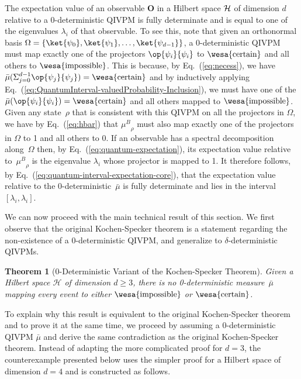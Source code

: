 \documentclass[english,reprint, aps, prl,superscriptaddress, showpacs,
showkeys, longbibliography, amsmath, amssymb, floatfix]{revtex4-1}
\theoremstyle{plain}
\newtheorem{thm}{Theorem}
\theoremstyle{definition}
\newcommand{\Hilb}{\mathcal{H}}
\newcommand{\imposs}{{\text{\wesa{impossible}}}}
\newcommand{\necess}{{\text{\wesa{certain}}}}
\newcommand{\proj}[1]{\op{#1}{#1}}
\newcommand{\muB}{\ensuremath{\mu^{B}}}
\begin{document}
The expectation value of an observable $\mathbf{O}$ in a Hilbert space
${\cal H}$ of dimension $d$ relative to a 0-deterministic QIVPM is
fully determinate and is equal to one of the eigenvalues $\lambda_i$
of that observable. To see this, note that given an orthonormal basis
$\Omega=\{ \ket{\psi_0},\ket{\psi_1},\ldots,\ket{\psi_{d-1}}\}$, a
0-deterministic QIVPM must map exactly one of the projectors
$\proj{\psi_i}$ to $\necess$ and all others to $\imposs$. This is
because, by Eq.~(\ref{eq:necess}), we have
$\bar{\mu}(\Sigma_{j=0}^{d-1}{\proj{\psi_j}})=\necess$ and by
inductively applying
Eq.~(\ref{eq:QuantumInterval-valuedProbability-Inclusion}), we must
have one of the $\bar{\mu}(\proj{\psi_i})=\necess$ and all others
mapped to $\imposs$. Given any state~$\rho$ that is consistent with
this QIVPM on all the projectors in $\Omega$, we have by
Eq.~(\ref{eq:hbar}) that $\muB_{\rho}$ must also map exactly one of
the projectors in $\Omega$ to 1 and all others to 0. If an observable
has a spectral decomposition along~$\Omega$ then, by
Eq.~(\ref{eq:quantum-expectation}), its expectation value relative
to~$\muB_{\rho}$ is the eigenvalue $\lambda_i$ whose projector is
mapped to 1. It therefore follows, by
Eq.~(\ref{eq:quantum-interval-expectation-core}), that the expectation
value relative to the 0-deterministic~${\bar{\mu}}$ is fully
determinate and lies in the interval $[\lambda_i,\lambda_i]$.

We can now proceed with the main technical result of this section. We
first observe that the original Kochen-Specker theorem is a statement
regarding the non-existence of a $0$-deterministic QIVPM, and
generalize to $\delta$-deterministic QIVPMs.

\begin{thm}[0-Deterministic Variant of the Kochen-Specker
  Theorem] \label{thm:Kochen-Specker} Given a Hilbert space $\Hilb$ of
  dimension $d\ge3$, there is no 0-deterministic measure~$\bar{\mu}$
  mapping every event to either $\imposs$ or $\necess$.
\end{thm}

\noindent To explain why this result is equivalent to the original
Kochen-Specker theorem and to prove it at the same time, we proceed by
assuming a 0-deterministic QIVPM $\bar{\mu}$ and derive the same
contradiction as the original Kochen-Specker theorem. Instead of
adapting the more complicated proof for $d=3$, the counterexample
presented below uses the simpler proof for a Hilbert space of
dimension $d=4$ and is constructed as follows.
\end{document}
